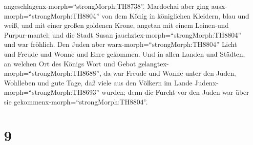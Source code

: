 angeschlagenx-morph=``strongMorph:TH8738''.  Mardochai aber
ging ausx-morph=``strongMorph:TH8804'' von dem König in königlichen
Kleidern, blau und weiß, und mit einer großen goldenen Krone, angetan
mit einem Leinen-und Purpur-mantel; und die Stadt Susan
jauchztex-morph=``strongMorph:TH8804'' und war fröhlich. 
Den Juden aber warx-morph=``strongMorph:TH8804'' Licht und Freude und
Wonne und Ehre gekommen.  Und in allen Landen und Städten,
an welchen Ort des Königs Wort und Gebot
gelangtex-morph=``strongMorph:TH8688'', da war Freude und Wonne unter
den Juden, Wohlleben und gute Tage, daß viele aus den Völkern im Lande
Judenx-morph=``strongMorph:TH8693'' wurden; denn die Furcht vor den
Juden war über sie gekommenx-morph=``strongMorph:TH8804''.

\hypertarget{section-8}{%
\section{9}\label{section-8}}


